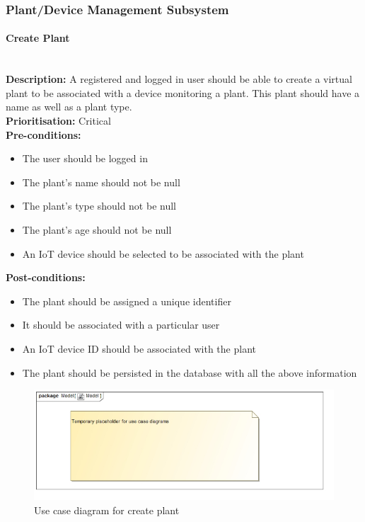 \documentclass{article}
\begin{document}
\subsubsection{Plant/Device Management Subsystem}
	\paragraph{Create Plant}\mbox{}\\
		\textbf{Description:} A registered and logged in user should be able to create a virtual plant to be associated with a device monitoring a plant. This plant should have a name as well as a plant type.\\
		\textbf{Prioritisation:} Critical\\		
		\textbf{Pre-conditions:}
			\begin{itemize}
				\item The user should be logged in
				\item The plant's name should not be null
				\item The plant's type should not be null
				\item The plant's age should not be null
				\item An IoT device should be selected to be associated with the plant
			\end{itemize}
		\textbf{Post-conditions:}
			\begin{itemize}
				\item The plant should be assigned a unique identifier
				\item It should be associated with a particular user
				\item An IoT device ID should be associated with the plant
				\item The plant should be persisted in the database with all the above information
			\end{itemize}

		\begin{figure}[H]
			\includegraphics[width=\linewidth]{images/tempUseCase.jpg}
			\caption{Use case diagram for create plant}
		\end{figure}
		
\end{document}
